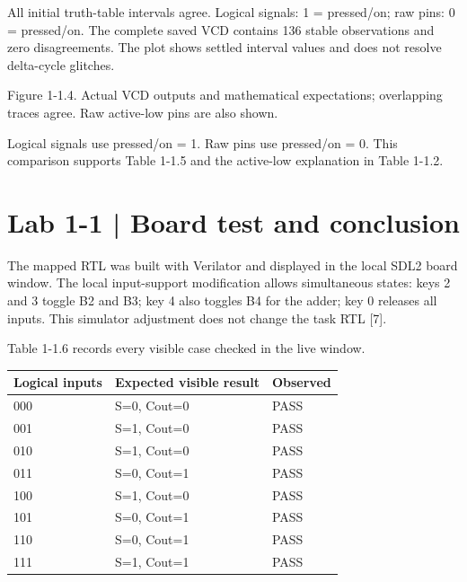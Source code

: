 \documentclass[10pt,a4paper]{article}
\begin{document}
{\small All initial truth-table intervals agree. Logical signals: 1 = pressed/on; raw pins: 0 = pressed/on. The complete saved VCD contains 136 stable observations and zero disagreements. The plot shows settled interval values and does not resolve delta-cycle glitches.}\par

{\small\raggedright Figure 1-1.4. Actual VCD outputs and mathematical expectations; overlapping traces agree. Raw active-low pins are also shown.\par}

{\small\raggedright Logical signals use pressed/on = 1. Raw pins use pressed/on = 0. This comparison supports Table 1-1.5 and the active-low explanation in Table 1-1.2.\par}

\clearpage

\section*{Lab 1-1 | Board test and conclusion}

{\small\raggedright The mapped RTL was built with Verilator and displayed in the local SDL2 board window. The local input-support modification allows simultaneous states: keys 2 and 3 toggle B2 and B3; key 4 also toggles B4 for the adder; key 0 releases all inputs. This simulator adjustment does not change the task RTL [7].\par}

{\small\raggedright Table 1-1.6 records every visible case checked in the live window.\par}

\begingroup\small\setlength{\tabcolsep}{4pt}
\renewcommand{\arraystretch}{1.20}
\noindent\begin{tabular}{@{}p{}p{}p{}@{}}
\toprule
\textbf{Logical inputs} & \textbf{Expected visible result} & \textbf{Observed} \\
\midrule
000 & S=0, Cout=0 & PASS \\
001 & S=1, Cout=0 & PASS \\
010 & S=1, Cout=0 & PASS \\
011 & S=0, Cout=1 & PASS \\
100 & S=1, Cout=0 & PASS \\
101 & S=0, Cout=1 & PASS \\
110 & S=0, Cout=1 & PASS \\
111 & S=1, Cout=1 & PASS \\
\bottomrule
\end{tabular}\par\endgroup
\vspace{2mm}
\end{document}
